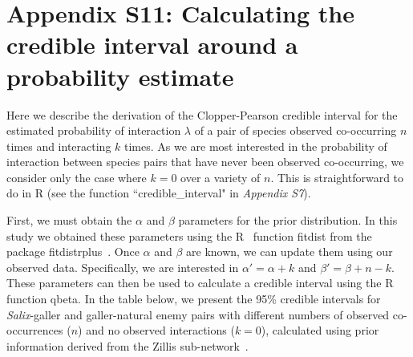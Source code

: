 \documentclass[12pt]{article}
\begin{document}
\clearpage

\section*{Appendix S11: Calculating the credible interval around a probability estimate}

  Here we describe the derivation of the Clopper-Pearson credible interval for the estimated probability of interaction $\lambda$ of a pair of species observed co-occurring $n$ times and interacting $k$ times. As we are most interested in the probability of interaction between species pairs that have never been observed co-occurring, we consider only the case where $k=0$ over a variety of $n$. This is straightforward to do in R (see the function ``credible\_interval" in \emph{Appendix S7}). 


  First, we must obtain the $\alpha$ and $\beta$ parameters for the prior distribution. In this study we obtained these parameters using the R~\citep{R} function fitdist from the package fitdistrplus~\citep{fitdistrplus}. Once $\alpha$ and $\beta$ are known, we can update them using our observed data. Specifically, we are interested in $\alpha'=\alpha+k$ and $\beta'=\beta+n-k$. These parameters can then be used to calculate a credible interval using the R~\citep{R} function qbeta. In the table below, we present the 95\% credible intervals for \emph{Salix}-galler and galler-natural enemy pairs with different numbers of observed co-occurrences ($n$) and no observed interactions ($k=0$), calculated using prior information derived from the Zillis sub-network~\citep{Kopelke2017}.
\end{document}
